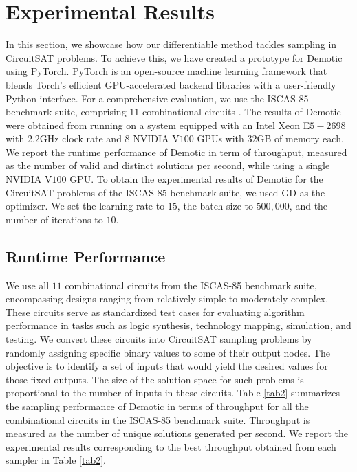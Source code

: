 
\section{Experimental Results}
In this section, we showcase how our differentiable method tackles sampling in CircuitSAT problems. To achieve this, we have created a prototype for {\sc Demotic} using PyTorch. PyTorch is an open-source machine learning framework that blends Torch's efficient GPU-accelerated backend libraries with a user-friendly Python interface. For a comprehensive evaluation, we use the ISCAS-85 benchmark suite, comprising $11$ combinational circuits \cite{Hansen1999ISCASBench}. The results of {\sc Demotic} were obtained from running on a system equipped with an Intel Xeon E$5-2698$ with $2.2$GHz clock rate and $8$ NVIDIA V$100$ GPUs with $32$GB of memory each. We report the runtime performance of {\sc Demotic} in term of throughput, measured as the number of valid and distinct solutions per second, while using a single NVIDIA V$100$ GPU. To obtain the experimental results of {\sc Demotic} for the CircuitSAT problems of the ISCAS-85 benchmark suite, we used GD as the optimizer. We set the learning rate to $15$, the batch size to $500,000$, and the number of iterations to $10$.






\subsection{Runtime Performance}
We use all $11$ combinational circuits from the ISCAS-85 benchmark suite, encompassing designs ranging from relatively simple to moderately complex. These circuits serve as standardized test cases for evaluating algorithm performance in tasks such as logic synthesis, technology mapping, simulation, and testing. We convert these circuits into CircuitSAT sampling problems by randomly assigning specific binary values to some of their output nodes. The objective is to identify a set of inputs that would yield the desired values for those fixed outputs. The size of the solution space for such problems is proportional to the number of inputs in these circuits. Table \ref{tab2} summarizes the sampling performance of {\sc Demotic} in terms of throughput for all the combinational circuits in the ISCAS-85 benchmark suite. Throughput is measured as the number of unique solutions generated per second. We report the experimental results corresponding to the best throughput obtained from each sampler in Table \ref{tab2}.

